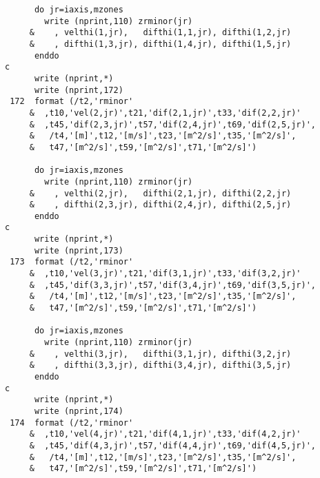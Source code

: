 \begin{verbatim}
      do jr=iaxis,mzones
        write (nprint,110) zrminor(jr)
     &    , velthi(1,jr),   difthi(1,1,jr), difthi(1,2,jr)
     &    , difthi(1,3,jr), difthi(1,4,jr), difthi(1,5,jr)
      enddo
c
      write (nprint,*)
      write (nprint,172)
 172  format (/t2,'rminor'
     &  ,t10,'vel(2,jr)',t21,'dif(2,1,jr)',t33,'dif(2,2,jr)'
     &  ,t45,'dif(2,3,jr)',t57,'dif(2,4,jr)',t69,'dif(2,5,jr)',
     &   /t4,'[m]',t12,'[m/s]',t23,'[m^2/s]',t35,'[m^2/s]',
     &   t47,'[m^2/s]',t59,'[m^2/s]',t71,'[m^2/s]')

      do jr=iaxis,mzones
        write (nprint,110) zrminor(jr)
     &    , velthi(2,jr),   difthi(2,1,jr), difthi(2,2,jr)
     &    , difthi(2,3,jr), difthi(2,4,jr), difthi(2,5,jr)
      enddo
c
      write (nprint,*)
      write (nprint,173)
 173  format (/t2,'rminor'
     &  ,t10,'vel(3,jr)',t21,'dif(3,1,jr)',t33,'dif(3,2,jr)'
     &  ,t45,'dif(3,3,jr)',t57,'dif(3,4,jr)',t69,'dif(3,5,jr)',
     &   /t4,'[m]',t12,'[m/s]',t23,'[m^2/s]',t35,'[m^2/s]',
     &   t47,'[m^2/s]',t59,'[m^2/s]',t71,'[m^2/s]')

      do jr=iaxis,mzones
        write (nprint,110) zrminor(jr)
     &    , velthi(3,jr),   difthi(3,1,jr), difthi(3,2,jr)
     &    , difthi(3,3,jr), difthi(3,4,jr), difthi(3,5,jr)
      enddo
c
      write (nprint,*)
      write (nprint,174)
 174  format (/t2,'rminor'
     &  ,t10,'vel(4,jr)',t21,'dif(4,1,jr)',t33,'dif(4,2,jr)'
     &  ,t45,'dif(4,3,jr)',t57,'dif(4,4,jr)',t69,'dif(4,5,jr)',
     &   /t4,'[m]',t12,'[m/s]',t23,'[m^2/s]',t35,'[m^2/s]',
     &   t47,'[m^2/s]',t59,'[m^2/s]',t71,'[m^2/s]')


\end{verbatim}
